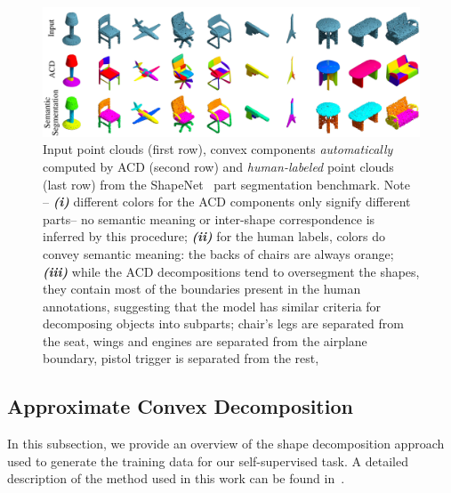 \begin{figure}[t]
    \centering
    \vspace{2mm}
    \includegraphics[width=\linewidth]{acd/imgs/acdexamples.pdf}
    \vspace{2mm}
    \caption{ \small{
    Input point clouds (first row), convex components \emph{automatically} computed by ACD (second row) and
    \emph{human-labeled} point clouds (last row) from the ShapeNet~\cite{Chang2015ShapeNetAI} part segmentation benchmark.
    Note -- \textit{\textbf{(i)}} different colors for the ACD components only signify different parts-- no semantic
    meaning or inter-shape correspondence is inferred by this procedure; 
    \textit{\textbf{(ii)}} for the human labels, colors do convey semantic meaning: \eg the backs of chairs are always orange;
    \textit{\textbf{(iii)}} while the ACD decompositions tend to oversegment the shapes, they contain 
    most of the boundaries present in the human annotations, 
    suggesting that the model has similar criteria for decomposing objects into subparts;
    \eg chair's legs are separated from the seat,
    wings and engines are separated from the airplane boundary, pistol trigger is separated from the rest, \etc~
    }}
    \label{fig:samples-of-acds}
\end{figure}



\subsection{Approximate Convex Decomposition}
\label{sec:acd}
In this subsection, we provide an overview of the shape decomposition approach used to 
generate the training data for our self-supervised task.
A detailed description of the method used in this work can be found in~\cite{vhacd}.

